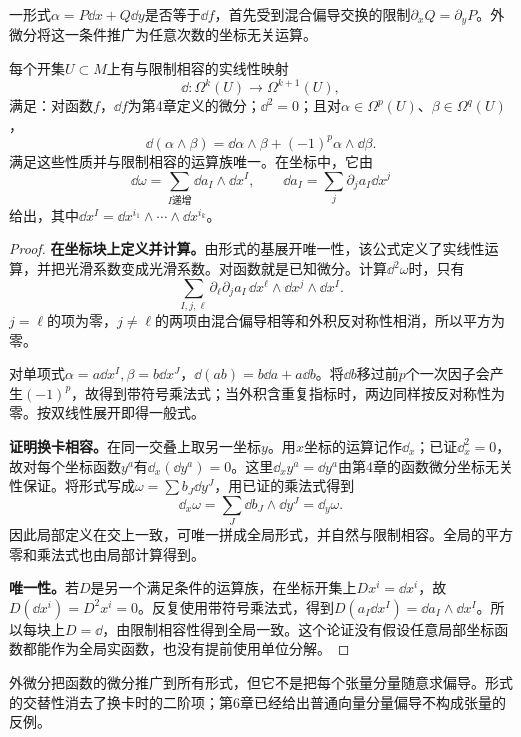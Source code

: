 一形式$\alpha=P\dd x+Q\dd y$是否等于$\dd f$，首先受到混合偏导交换的限制$\partial_xQ=\partial_yP$。外微分将这一条件推广为任意次数的坐标无关运算。
\begin{theorem}\label{thm:exterior-derivative}
每个开集$U\subset M$上有与限制相容的实线性映射
\[
 \dd:\Omega^k(U)\to\Omega^{k+1}(U),
\]
满足：对函数$f$，$\dd f$为第4章定义的微分；$\dd^2=0$；且对$\alpha\in\Omega^p(U)$、$\beta\in\Omega^q(U)$，
\[
 \dd(\alpha\wedge\beta)=\dd\alpha\wedge\beta+(-1)^p\alpha\wedge\dd\beta.
\]
满足这些性质并与限制相容的运算族唯一。在坐标中，它由
\[
 \dd\omega=\sum_{I\text{递增}}\dd a_I\wedge\dd x^I,
 \qquad\dd a_I=\sum_j\partial_j a_I\dd x^j
\]
给出，其中$\dd x^I=\dd x^{i_1}\wedge\cdots\wedge\dd x^{i_k}$。
\end{theorem}
\begin{proof}
\textbf{在坐标块上定义并计算。}由形式的基展开唯一性，该公式定义了实线性运算，并把光滑系数变成光滑系数。对函数就是已知微分。计算$\dd^2\omega$时，只有
\[
 \sum_{I,j,\ell}\partial_\ell\partial_j a_I\,
 \dd x^\ell\wedge\dd x^j\wedge\dd x^I.
\]
$j=\ell$的项为零，$j\ne\ell$的两项由混合偏导相等和外积反对称性相消，所以平方为零。

对单项式$\alpha=a\dd x^I,\beta=b\dd x^J$，$\dd(ab)=b\dd a+a\dd b$。将$\dd b$移过前$p$个一次因子会产生$(-1)^p$，故得到带符号乘法式；当外积含重复指标时，两边同样按反对称性为零。按双线性展开即得一般式。

\textbf{证明换卡相容。}在同一交叠上取另一坐标$y$。用$x$坐标的运算记作$\dd_x$；已证$\dd_x^2=0$，故对每个坐标函数$y^a$有$\dd_x(\dd y^a)=0$。这里$\dd_x y^a=\dd y^a$由第4章的函数微分坐标无关性保证。将形式写成$\omega=\sum b_J\dd y^J$，用已证的乘法式得到
\[
 \dd_x\omega=\sum_J\dd b_J\wedge\dd y^J=\dd_y\omega.
\]
因此局部定义在交上一致，可唯一拼成全局形式，并自然与限制相容。全局的平方零和乘法式也由局部计算得到。

\textbf{唯一性。}若$D$是另一个满足条件的运算族，在坐标开集上$Dx^i=\dd x^i$，故$D(\dd x^i)=D^2x^i=0$。反复使用带符号乘法式，得到$D(a_I\dd x^I)=\dd a_I\wedge\dd x^I$。所以每块上$D=\dd$，由限制相容性得到全局一致。这个论证没有假设任意局部坐标函数都能作为全局实函数，也没有提前使用单位分解。
\end{proof}
外微分把函数的微分推广到所有形式，但它不是把每个张量分量随意求偏导。形式的交替性消去了换卡时的二阶项；第6章已经给出普通向量分量偏导不构成张量的反例。
